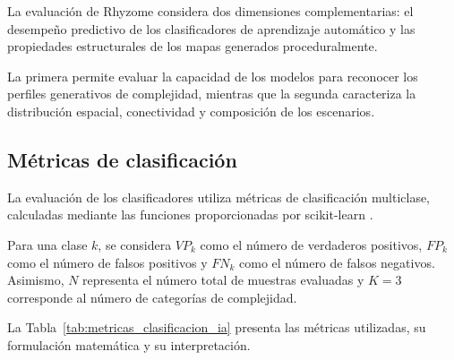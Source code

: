 La evaluación de Rhyzome considera dos dimensiones complementarias: el desempeño predictivo de los clasificadores de aprendizaje automático y las propiedades estructurales de los mapas generados proceduralmente.

La primera permite evaluar la capacidad de los modelos para reconocer los perfiles generativos de complejidad, mientras que la segunda caracteriza la distribución espacial, conectividad y composición de los escenarios.


\subsection{Métricas de clasificación}
\label{subsec:metricas_clasificacion}

La evaluación de los clasificadores utiliza métricas de clasificación multiclase, calculadas mediante las funciones proporcionadas por scikit-learn \parencite{pedregosa2011}.

Para una clase $k$, se considera $VP_k$ como el número de verdaderos positivos, $FP_k$ como el número de falsos positivos y $FN_k$ como el número de falsos negativos. Asimismo, $N$ representa el número total de muestras evaluadas y $K=3$ corresponde al número de categorías de complejidad.

La Tabla~\ref{tab:metricas_clasificacion_ia} presenta las métricas utilizadas, su formulación matemática y su interpretación.

